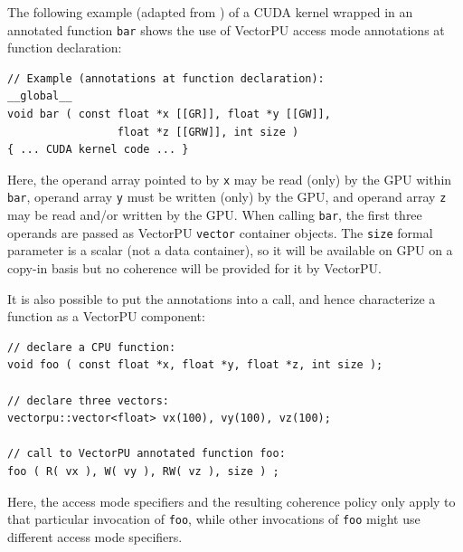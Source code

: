 The following example (adapted from \cite{VectorPU-2017}) 
of a CUDA kernel wrapped in an 
 annotated function \verb.bar. shows the use of 
VectorPU access mode annotations at function declaration:

{\footnotesize \begin{verbatim}
// Example (annotations at function declaration): 
__global__
void bar ( const float *x [[GR]], float *y [[GW]],
                 float *z [[GRW]], int size )
{ ... CUDA kernel code ... }
\end{verbatim}}

Here, the operand array pointed to by \verb.x. may be read (only) by the GPU within \verb.bar.,
operand array \verb.y. must be written (only) by the GPU, and 
operand array \verb.z. may be read and/or written by the GPU.
When calling \verb.bar., the
first three operands are  passed as VectorPU \verb.vector. 
container objects.
The \verb.size. formal parameter is a scalar (not a data container), so it
will be available on GPU on a copy-in basis but no coherence will
be provided for it by VectorPU.

It is also possible to put the annotations into a call, and hence characterize a function as a VectorPU component:


{\footnotesize \begin{verbatim}
// declare a CPU function:
void foo ( const float *x, float *y, float *z, int size );

// declare three vectors:
vectorpu::vector<float> vx(100), vy(100), vz(100);

// call to VectorPU annotated function foo:
foo ( R( vx ), W( vy ), RW( vz ), size ) ;
\end{verbatim}}

Here, the access mode specifiers and the resulting coherence policy
 only apply to that particular invocation of \verb-foo-, while other
invocations of \verb-foo- might use different access mode specifiers.

